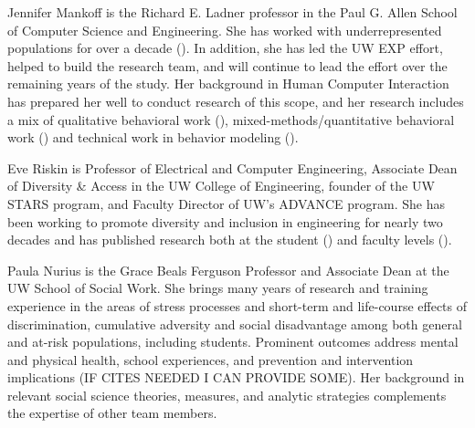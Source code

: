 Jennifer Mankoff is the Richard E. Ladner professor in the Paul G. Allen School of Computer Science and Engineering. She has worked with underrepresented populations for over a decade (\eg \cite{newman2004perceptions,DBLP:conf/huc/DillahuntMPF09,DBLP:conf/cscw/DillahuntM14,DBLP:conf/huc/DillahuntMP10,DBLP:journals/pacmhci/EarlyHHRWM18,DBLP:conf/chi/OLearyZMR19}). In addition, she has led the UW EXP effort, helped to build the research team, and will continue to lead the effort over the remaining years of the study. Her background in Human Computer Interaction has prepared her well to conduct research of this scope, and her research includes a mix of qualitative behavioral work (\eg \cite{DBLP:conf/huc/DillahuntMPF09,DBLP:conf/chi/MankoffKKRW11}), mixed-methods/quantitative behavioral work (\eg \cite{DBLP:conf/ph/CrawfordGSAM14,DBLP:journals/pacmhci/EarlyHHRWM18}) and technical work in behavior modeling (\eg \cite{DBLP:conf/chi/BanovicBCMD16}). 
 
Eve Riskin is Professor of Electrical and Computer Engineering, Associate Dean of Diversity \& Access in the UW College of Engineering, founder of the UW STARS program, and Faculty Director of UW's ADVANCE program. She has been working to promote diversity and inclusion in engineering for nearly two decades and has published research both at the student (\cite{carriganactive,myers2018redshirt}) and faculty levels (\cite{carrigan2017ramping,carrigan2011gendered,yen2019promoting}).
 
Paula Nurius is the Grace Beals Ferguson Professor and Associate Dean at the UW School of Social Work. She brings many years of research and training experience in the areas of stress processes and short-term and life-course effects of discrimination, cumulative adversity and social disadvantage among both general and at-risk populations, including students. Prominent outcomes address mental and physical health, school experiences, and prevention and intervention implications (IF CITES NEEDED I CAN PROVIDE SOME). Her background in relevant social science theories, measures, and analytic strategies complements the expertise of other team members. 
